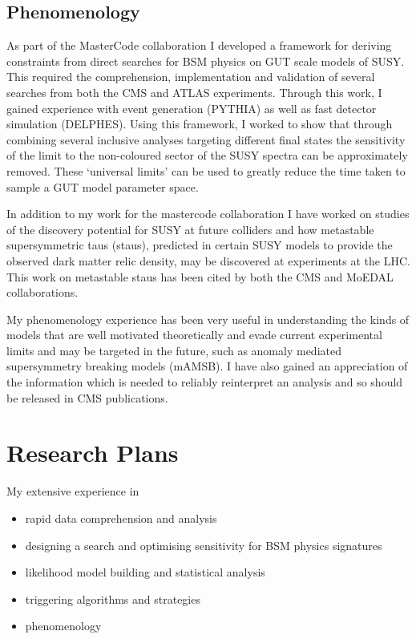 \documentclass[11pt]{article}
\theoremstyle{plain} \numberwithin{equation}{section}
\theoremstyle{definition}
\begin{document}
\subsection*{Phenomenology}
As part of the MasterCode collaboration I developed a framework for 
deriving constraints from direct searches for BSM physics on GUT scale models of SUSY.
This required the comprehension, implementation and validation of several 
searches from both the CMS and ATLAS experiments. Through this work, I gained experience with 
event generation (PYTHIA) as well as fast detector simulation (DELPHES).
Using this framework, I worked to show that through combining several inclusive analyses targeting 
different final states the sensitivity of the limit to the non-coloured sector of the SUSY spectra can be approximately removed. 
These `universal limits' can be used to greatly reduce the 
time taken to sample a GUT model parameter space. 

In addition to my work for the mastercode collaboration I have worked on 
studies of the discovery potential for SUSY at future colliders and how 
metastable supersymmetric taus (staus), predicted in certain SUSY models to provide the observed
dark matter relic density, may be discovered at experiments at the LHC. 
This work on metastable staus has been cited by both the CMS and MoEDAL collaborations.

My phenomenology experience has been very useful in understanding
the kinds of models that are well motivated theoretically and evade current experimental limits and may be targeted in the 
future, such as anomaly mediated supersymmetry breaking models (mAMSB). I have also gained an appreciation
of the information which is needed to reliably reinterpret an analysis and so should be released in CMS publications.

\section*{Research Plans}

My extensive experience in

\begin{itemize}
\item rapid data comprehension and analysis
\item designing a search and optimising sensitivity for BSM physics signatures
\item likelihood model building and statistical analysis 
\item triggering algorithms and strategies
\item phenomenology
\end{itemize}
\end{document}
